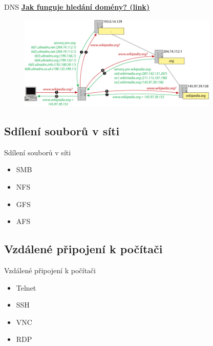 \documentclass[aspectratio=169,xcolor=dvipsnames, t]{beamer}
\begin{document}
\begin{frame}{DNS}
    \vspace{-0.5cm}
    \textbf{\Large \href{https://www.jakfungujedns.cz/}{Jak funguje hledání domény? (link)}}
    \begin{figure}
        \centering
        \includegraphics[width=0.85\textwidth]{dns}
    \end{figure}
\end{frame}

\subsection{Sdílení souborů v síti}
\begin{frame}{Sdílení souborů v síti}
    \begin{itemize}
        \item SMB
        \item NFS
        \item GFS
        \item AFS
    \end{itemize}
\end{frame}

\subsection{Vzdálené připojení k počítači}
\begin{frame}{Vzdálené připojení k počítači}
    \begin{itemize}
        \item Telnet
        \item SSH
        \item VNC
        \item RDP
    \end{itemize}
\end{frame}

\makefinalpage
\end{document}
